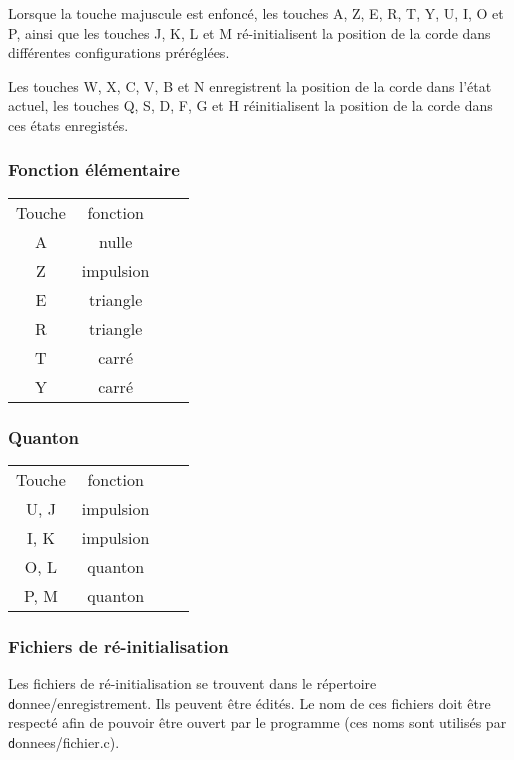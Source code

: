 Lorsque la touche majuscule est enfoncé, les touches {\sf A}, {\sf Z}, {\sf E}, {\sf R}, {\sf T}, {\sf Y}, {\sf U}, {\sf I}, {\sf O} et {\sf P}, ainsi que les touches {\sf J}, {\sf K}, {\sf L} et {\sf M} ré-initialisent la position de la corde dans différentes configurations préréglées.

Les touches {\sf W}, {\sf X}, {\sf C}, {\sf V}, {\sf B} et {\sf N} enregistrent la position de la corde dans l'état actuel, les touches {\sf Q}, {\sf S}, {\sf D}, {\sf F}, {\sf G} et {\sf H} réinitialisent la position de la corde dans ces états enregistés.
%
\subsubsection{Fonction élémentaire}
%
\begin{center}
\begin{tabular}{cc cc}%
Touche & fonction \\
A & nulle &\\
Z & impulsion &\\
E & triangle&\\
R & triangle&\\
T & carré &\\
Y & carré &\\
\end{tabular}
\end{center}
%
\subsubsection{Quanton}
%
\begin{center}
\begin{tabular}{cc cc}%
Touche & fonction \\
U, J & impulsion &\\
I, K & impulsion &\\
O, L & quanton &\\
P, M & quanton &\\
\end{tabular}
\end{center}

\subsubsection{Fichiers de ré-initialisation}
Les fichiers de ré-initialisation se trouvent dans le répertoire {\texttt donnee/enregistrement}. Ils peuvent être édités. Le nom de ces fichiers doit être respecté afin de pouvoir être ouvert par le programme (ces noms sont utilisés par {\texttt donnees/fichier.c}).
%
%
